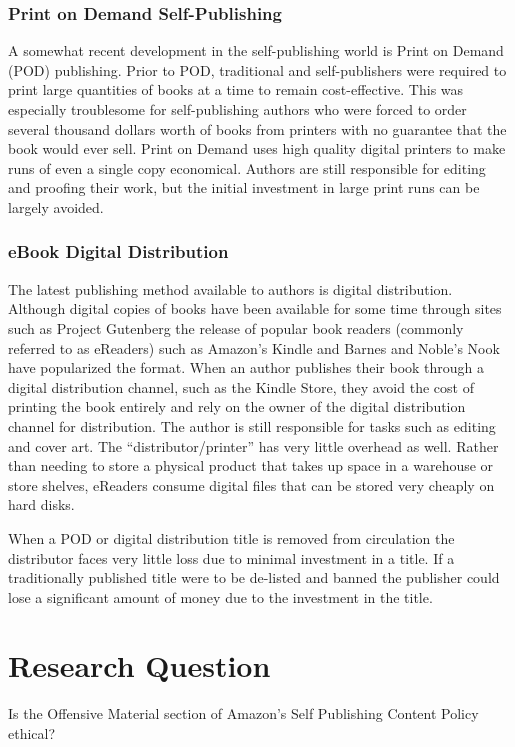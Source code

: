 \documentclass[11pt]{article}
\begin{document}
\begin{multicols}{2}
\subsubsection{Print on Demand Self-Publishing}

A somewhat recent development in the self-publishing world is Print on Demand  (POD) publishing.  Prior to POD, traditional and self-publishers were required to print large quantities of books at a time to remain cost-effective. This was especially troublesome for self-publishing authors who were forced to order several thousand dollars worth of books \cite{EHowSelfPub} from printers with no guarantee that the book would ever sell.  Print on Demand uses high quality digital printers to make runs of even a single copy economical. Authors are still responsible for editing and proofing their work, but the initial investment in large print runs can be largely avoided.

\subsubsection{eBook Digital Distribution}

The latest publishing method available to authors is digital distribution.  Although digital copies of books have been available for some time through sites such as Project Gutenberg \cite{ProjectGutenberg} the release of popular book readers (commonly referred to as eReaders) such as Amazon's Kindle and Barnes and Noble's Nook have popularized the format.  When an author publishes their book through a digital distribution channel, such as the Kindle Store, they avoid the cost of printing the book entirely and rely on the owner of the digital distribution channel for distribution.  The author is still responsible for tasks such as editing and cover art.  The ``distributor/printer'' has very little overhead as well.  Rather than needing to store a physical product that takes up space in a warehouse or store shelves, eReaders consume digital files that can be stored very cheaply on hard disks.

When a POD or digital distribution title is removed from circulation the distributor faces very little loss due to minimal investment in a title.  If a traditionally published title were to be de-listed and banned the publisher could lose a significant amount of money due to the investment in the title.

\section{Research Question}
Is the Offensive Material section of Amazon's Self Publishing Content Policy ethical?


\end{multicols}
\end{document}
